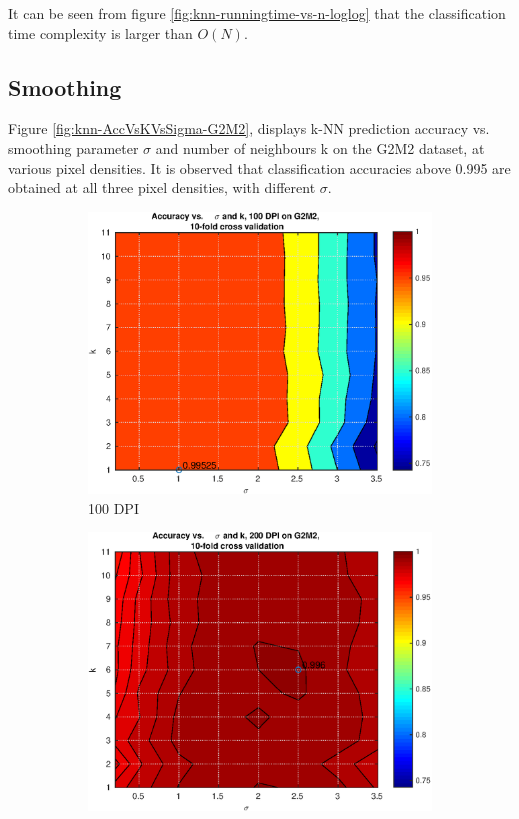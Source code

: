 It can be seen from figure \ref{fig:knn-runningtime-vs-n-loglog} that
the classification time complexity is larger than \(O(N)\).

\subsection{Smoothing}
Figure \ref{fig:knn-AccVsKVsSigma-G2M2},
displays k-NN prediction accuracy vs. smoothing parameter \(\sigma\)
and number of neighbours k on the G2M2 dataset, at various pixel densities.
It is observed that classification accuracies above 0.995
are obtained at all three pixel densities, with different \(\sigma\).
\begin{figure}[ht]
	\centering
	\begin{subfigure}{0.46\textwidth}
		\includegraphics[width = \textwidth]{img/knn-AccVsKVsSigma-G2M2-dpi100-cv10}
		\caption{100 DPI}
	\end{subfigure}
	\begin{subfigure}{0.46\textwidth}
		\includegraphics[width = \textwidth]{img/knn-AccVsKVsSigma-G2M2-dpi200-cv10}

\end{subfigure}
\end{figure}
